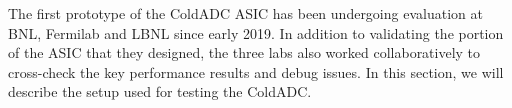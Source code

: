\label{sec:2}


The first prototype of the ColdADC ASIC has been undergoing evaluation at BNL, Fermilab and LBNL since early 2019. In addition to validating the portion of the ASIC that they designed, the three labs also worked collaboratively to cross-check the key performance results and debug issues. In this section, we will describe the setup used for testing the ColdADC.
